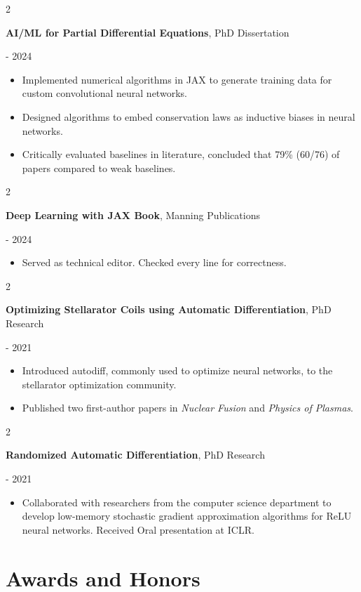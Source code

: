 \documentclass[10pt, letterpaper]{article}
\newenvironment{highlights}{
    \begin{itemize}[
        topsep=0.10 cm,
        parsep=0.10 cm,
        partopsep=0pt,
        itemsep=0pt,
        leftmargin=0.4 cm + 10pt
    ]
}{
    \end{itemize}
} %
\newenvironment{twocolentry}[2][]{
    \onecolentry
    \def\secondColumn{#2}
    \setcolumnwidth{\fill, 4.5 cm}
    \begin{paracol}{2}
}{
    \switchcolumn \raggedleft \secondColumn
    \end{paracol}
    \endonecolentry
} %
\begin{document}
\begin{twocolentry}{2021 - 2024}
    \textbf{AI/ML for Partial Differential Equations}, PhD Dissertation
\end{twocolentry}
    \begin{highlights}
        \item Implemented numerical algorithms in JAX to generate training data for custom convolutional neural networks.
        \item Designed algorithms to embed conservation laws as inductive biases in neural networks.
        \item Critically evaluated baselines in literature, concluded that 79\% (60/76) of papers compared to weak baselines.
    \end{highlights}
\begin{twocolentry}{2023 - 2024}
    \textbf{Deep Learning with JAX Book}, Manning Publications
\end{twocolentry}
    \begin{highlights}
        \item Served as technical editor. Checked every line for correctness.
    \end{highlights}
\begin{twocolentry}{2019 - 2021}
    \textbf{Optimizing Stellarator Coils using Automatic Differentiation}, PhD Research
\end{twocolentry}
    \begin{highlights}
        \item Introduced autodiff, commonly used to optimize neural networks, to the stellarator optimization community.
        \item Published two first-author papers in \textit{Nuclear Fusion} and \textit{Physics of Plasmas}.
    \end{highlights}
\begin{twocolentry}{2019 - 2021}
    \textbf{Randomized Automatic Differentiation}, PhD Research
\end{twocolentry}
    \begin{highlights}
        \item Collaborated with researchers from the computer science department to develop low-memory stochastic gradient approximation algorithms for ReLU neural networks. Received Oral presentation at ICLR.
    \end{highlights}

\section{Awards and Honors}
\end{document}
